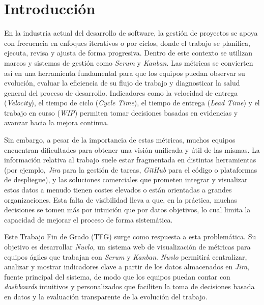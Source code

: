 \chapter{Introducción}
\label{Introduccion}


En la industria actual del desarrollo de software, la gestión de proyectos se apoya con frecuencia en enfoques iterativos o por ciclos, donde el trabajo se planifica, ejecuta, revisa y ajusta de forma progresiva. Dentro de este contexto se utilizan marcos y sistemas de gestión como \textit{Scrum} y \textit{Kanban}. Las métricas se convierten así en una herramienta fundamental para que los equipos puedan observar su evolución, evaluar la eficiencia de su flujo de trabajo y diagnosticar la salud general del proceso de desarrollo. Indicadores como la velocidad de entrega (\textit{Velocity}), el tiempo de ciclo (\textit{Cycle Time}), el tiempo de entrega (\textit{Lead Time}) y el trabajo en curso (\textit{WIP}) permiten tomar decisiones basadas en evidencias y avanzar hacia la mejora continua.

Sin embargo, a pesar de la importancia de estas métricas, muchos equipos encuentran dificultades para obtener una visión unificada y útil de las mismas. La información relativa al trabajo suele estar fragmentada en distintas herramientas (por ejemplo, \textit{Jira} para la gestión de tareas, \textit{GitHub} para el código o plataformas de despliegue), y las soluciones comerciales que prometen integrar y visualizar estos datos a menudo tienen costes elevados o están orientadas a grandes organizaciones. Esta falta de visibilidad lleva a que, en la práctica, muchas decisiones se tomen más por intuición que por datos objetivos, lo cual limita la capacidad de mejorar el proceso de forma sistemática.

Este Trabajo Fin de Grado (TFG) surge como respuesta a esta problemática. Su objetivo es desarrollar \textit{Nuvlo}, un sistema web de visualización de métricas para equipos ágiles que trabajan con \textit{Scrum} y \textit{Kanban}. \textit{Nuvlo} permitirá centralizar, analizar y mostrar indicadores clave a partir de los datos almacenados en \textit{Jira}, fuente principal del sistema, de modo que los equipos puedan contar con \textit{dashboards} intuitivos y personalizados que faciliten la toma de decisiones basada en datos y la evaluación transparente de la evolución del trabajo.


